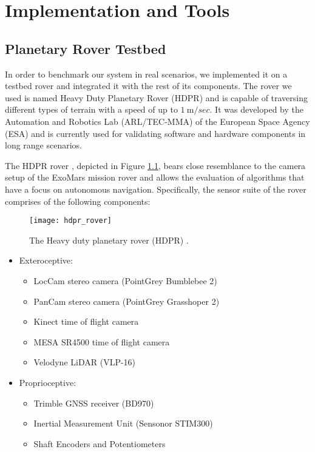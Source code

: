 \label{Chapter3}

\chapter{Implementation and Tools}

\section{Planetary Rover Testbed} \label{hdpr_rover}

In order to benchmark our system in real scenarios, we implemented it
on a testbed rover and integrated it with the rest of its components.
The rover we used is named Heavy Duty Planetary Rover (HDPR) and is
capable of traversing different types of terrain with a speed of up to
$\SI{1}{\m \per sec}$.
It was developed by the Automation and Robotics Lab (ARL/TEC-MMA) of the
European Space Agency (ESA) and is currently used for validating
software and hardware components in long range scenarios.

The HDPR rover \parencite{Boukas2016}, depicted in Figure
\ref{fig:hdpr_rover}, bears close resemblance to the camera setup of the
ExoMars mission rover \parencite{Vago2017} and allows the evaluation
of algorithms that have a focus on autonomous navigation.
Specifically, the sensor suite of the rover comprises of the following
components:

\begin{figure}[h!]
    \centering
    \texttt{[image: hdpr\_rover]}
    \caption[Heavy duty planetary rover]{
        The Heavy duty planetary rover (HDPR) \parencite{Boukas2016}.
    }
    \label{fig:hdpr_rover}
\end{figure}

\begin{itemize}
    \item Exteroceptive:
        \begin{itemize}
            \item LocCam stereo camera (PointGrey Bumblebee 2)
            \item PanCam stereo camera (PointGrey Grasshoper 2)
            \item Kinect time of flight camera
            \item MESA SR4500 time of flight camera
            \item Velodyne LiDAR (VLP-16)
        \end{itemize}
    \item Proprioceptive:
        \begin{itemize}
            \item Trimble GNSS receiver (BD970)
            \item Inertial Measurement Unit (Sensonor STIM300)
            \item Shaft Encoders and Potentiometers
        \end{itemize}
\end{itemize}

